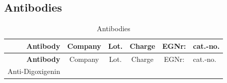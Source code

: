 \documentclass[11pt,singlespacinge,twoside]{reedthesis} %
\begin{document}
\hypertarget{mat-anitb}{%
\subsection{Antibodies}\label{mat-anitb}}
\begin{longtable}[]{@{}rccccl@{}}
\caption{\label{tab:mat-antib} Antibodies}\tabularnewline
\toprule
\begin{minipage}[b]{0.19\columnwidth}\raggedleft
\textbf{Antibody}\strut
\end{minipage} & \begin{minipage}[b]{0.15\columnwidth}\centering
Company\strut
\end{minipage} & \begin{minipage}[b]{0.12\columnwidth}\centering
Lot.\strut
\end{minipage} & \begin{minipage}[b]{0.12\columnwidth}\centering
Charge\strut
\end{minipage} & \begin{minipage}[b]{0.12\columnwidth}\centering
EGNr:\strut
\end{minipage} & \begin{minipage}[b]{0.14\columnwidth}\raggedright
cat.-no.\strut
\end{minipage}\tabularnewline
\midrule
\endfirsthead
\toprule
\begin{minipage}[b]{0.19\columnwidth}\raggedleft
\textbf{Antibody}\strut
\end{minipage} & \begin{minipage}[b]{0.15\columnwidth}\centering
Company\strut
\end{minipage} & \begin{minipage}[b]{0.12\columnwidth}\centering
Lot.\strut
\end{minipage} & \begin{minipage}[b]{0.12\columnwidth}\centering
Charge\strut
\end{minipage} & \begin{minipage}[b]{0.12\columnwidth}\centering
EGNr:\strut
\end{minipage} & \begin{minipage}[b]{0.14\columnwidth}\raggedright
cat.-no.\strut
\end{minipage}\tabularnewline
\midrule
\endhead
\begin{minipage}[t]{0.19\columnwidth}\raggedleft
Anti-Digoxigenin\strut
\end{minipage} & \begin{minipage}[t]{0.15\columnwidth}\centering

\end{minipage}
\end{longtable}
\end{document}
